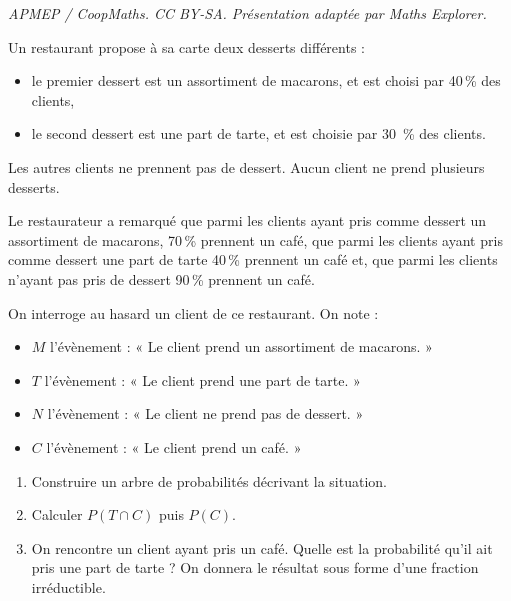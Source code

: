 \documentclass[10pt]{article}
\begin{document}
\noindent\textit{APMEP / CoopMaths. CC BY-SA. Présentation adaptée par Maths Explorer.}\par\medskip
\medskip

Un restaurant propose à sa carte deux desserts différents :
\begin{itemize}
\item  le premier dessert est un assortiment de macarons, et est choisi par 40\,\% des clients,
\item le second dessert est une part de tarte, et est choisie par 30 \,\% des clients.
\end{itemize}
Les autres clients ne prennent pas de dessert. Aucun client ne prend plusieurs desserts.

Le restaurateur a remarqué 
que parmi les clients ayant pris comme dessert un assortiment de macarons, 70\,\% prennent un café,
que parmi les clients ayant pris comme dessert une part de tarte 40\,\% prennent un café et,
que parmi les clients n’ayant pas pris de dessert 90\,\% prennent un café. 
 
On interroge au hasard un client de ce restaurant. On note :

\begin{itemize}
\item [*] $M$ l’évènement : « Le client prend un assortiment de macarons. »
\item [*] $T$ l’évènement : « Le client prend une part de tarte. »
\item [*] $N$ l’évènement : « Le client ne prend pas de dessert. »
\item [*]$C$ l’évènement : « Le client prend un café. »
\end{itemize}

\medskip

\begin{enumerate}
\item Construire un arbre de probabilités décrivant la situation.
\item Calculer $P(T\cap C)$  puis $P(C)$.
\item On rencontre un client ayant pris un café. Quelle est la probabilité qu’il ait pris une part de tarte ? On donnera le résultat sous forme d’une fraction irréductible.
\end{enumerate}

\vspace{0,5cm}
\end{document}
